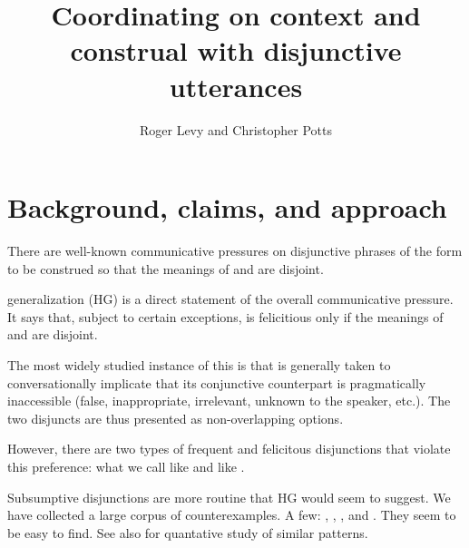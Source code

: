 \documentclass{article}
\begin{document}

\title{Coordinating on context and construal with disjunctive utterances}
\author{Roger Levy and Christopher Potts}
\maketitle


\section{Background, claims, and approach}\label{sec:introduction}

\begin{examples}

\item There are well-known communicative pressures on disjunctive
  phrases of the form  to be construed so that the
  meanings of  and  are disjoint.

\item {} generalization (HG) is a direct
  statement of the overall communicative pressure. It says that,
  subject to certain exceptions,  is felicitious only if
  the meanings of  and  are disjoint.

\item The most widely studied instance of this is that 
  is generally taken to conversationally implicate that its
  conjunctive counterpart  is pragmatically inaccessible
  (false, inappropriate, irrelevant, unknown to the speaker,
  etc.). The two disjuncts are thus presented as non-overlapping
  options.

\item However, there are two types of frequent and felicitous
  disjunctions that violate this preference: what we call
   like  and
   like 
  \citep{Horn89,Rohdenburg:1985}.

\item Subsumptive disjunctions are more routine that HG would seem to
  suggest. We have collected a large corpus of counterexamples. A few:
  , , ,  and .  They seem to be easy to find.  See also
  \citet{Chemla-HurfordCounts} for quantative study of similar
  patterns.


\end{examples}
\end{document}
